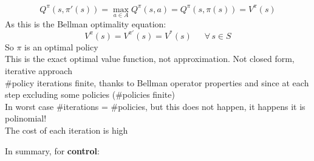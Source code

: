 \begin{enumerate}
        $$Q^\pi(s,\pi'(s))=\max_{a \in A}Q^\pi(s,a) = Q^\pi(s,\pi(s))=V^\pi(s)$$
        As this is the Bellman optimality equation:
        $$V^\pi(s)=V^{\pi'}(s)=V^*(s)\,\,\,\,\,\,\,\,\,\forall\,s \in S$$
        So $\pi$ is an optimal policy\\
        This is the exact optimal value function, not approximation. Not closed form, iterative approach\\
        \#policy iterations finite, thanks to Bellman operator properties and since at each step excluding some policies (\#policies finite)\\
        In worst case \#iterations = \#policies, but this does not happen, it happens it is polinomial!\\
        The cost of each iteration is high
    \end{enumerate}
    In summary, for \textbf{control}:
    
    
